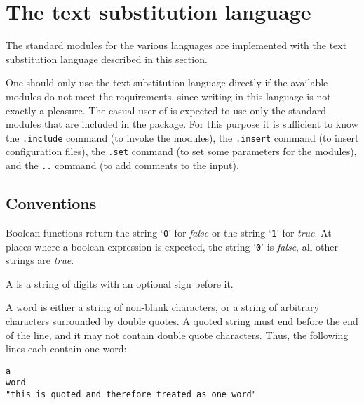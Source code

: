 \chapter{The text substitution language}
\label{s.tm}
The standard modules for the various languages are implemented
with the text substitution language described in this section.
\par
One should only use the text substitution language directly if the available
modules do not meet the requirements,
since writing in this language is not exactly a pleasure.
The casual user of {\Tm} is expected to use only the standard modules that
are included in the {\Tm} package.
For this purpose it is sufficient to know
the {\tt .include} command (to invoke the modules),
the {\tt .insert} command (to insert configuration files),
the {\tt .set} command (to set some parameters for the modules),
and the {\tt ..} command (to add comments to the {\Tm} input).
\section{Conventions}
Boolean functions return the string `{\tt 0}' for
{\it false} \/or the string `{\tt 1}' for {\it true}.
At places where a boolean expression is expected,
the string `{\tt 0}' is {\it false},
all other strings are {\it true}.
\par
A  is a string of digits with an optional sign before it.
\par
A word is either a string of non-blank characters, or a string of
arbitrary characters surrounded by double quotes. A quoted string
must end before the end of the line, and it may not contain
double quote characters.
Thus,
the following lines each contain one word:
\begin{verbatim}
a
word
"this is quoted and therefore treated as one word"
\end{verbatim}
